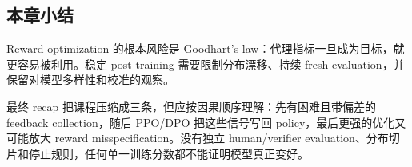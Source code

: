 \subsection{本章小结}

Reward optimization 的根本风险是 Goodhart's law：代理指标一旦成为目标，就更容易被利用。稳定 post-training 需要限制分布漂移、持续 fresh evaluation，并保留对模型多样性和校准的观察。


最终 recap 把课程压缩成三条，但应按因果顺序理解：先有困难且带偏差的 feedback collection，随后 PPO/DPO 把这些信号写回 policy，最后更强的优化又可能放大 reward misspecification。没有独立 human/verifier evaluation、分布切片和停止规则，任何单一训练分数都不能证明模型真正变好。

